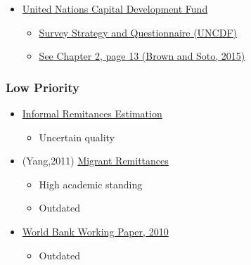 \documentclass[
  11pt,
]{article}
\providecommand{\tightlist}{%
  \setlength{\itemsep}{0pt}\setlength{\parskip}{0pt}}
\begin{document}
\begin{itemize}
\tightlist
\item
  \href{https://migrantmoney.uncdf.org/wp-content/uploads/2023/02/Migrant-Money-Note-7-FINAL-1.pdf}{United
  Nations Capital Development Fund}

  \begin{itemize}
  \tightlist
  \item
    \href{https://migrantmoney.uncdf.org/wp-content/uploads/2024/03/Survey-Strategy-and-Questionnaire-on-Estimating-Informal-Remittances.pdf}{Survey
    Strategy and Questionnaire (UNCDF)}
  \item
    \href{https://drive.google.com/file/d/1k0uVC2048y44iZSlEIvRWjE2d-l0HbXu/view?usp=sharing}{See
    Chapter 2, page 13 (Brown and Soto, 2015)}
  \end{itemize}
\end{itemize}

\subsubsection{Low Priority}\label{low-priority}

\begin{itemize}
\tightlist
\item
  \href{https://www.graduateinstitute.ch/sites/internet/files/2024-09/ARP-38-Final-Report--2024----Zeyu-Wei.pdf}{Informal
  Remitances Estimation}

  \begin{itemize}
  \tightlist
  \item
    Uncertain quality
  \end{itemize}
\item
  (Yang,2011)
  \href{https://deanyang-econ.github.io/deanyang/files/yang_2011_jep.25.3.pdf}{Migrant
  Remittances}

  \begin{itemize}
  \tightlist
  \item
    High academic standing
  \item
    Outdated
  \end{itemize}
\item
  \href{https://documents1.worldbank.org/curated/en/850091468163748685/pdf/538840PUB0Migr101Official0Use0Only1.pdf}{World
  Bank Working Paper, 2010}

  \begin{itemize}
  \tightlist
  \item
    Outdated
  \end{itemize}
\end{itemize}


\printbibliography
\end{document}

